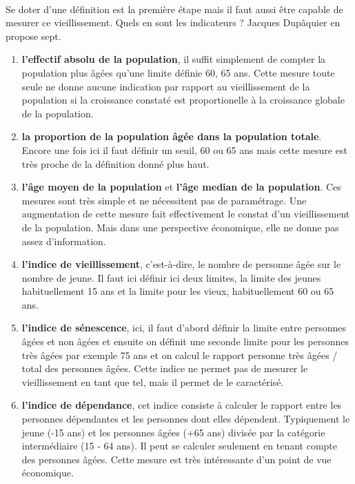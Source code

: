 \paragraph{}Se doter d’une définition est la première étape mais il faut aussi être capable de mesurer ce vieillissement. Quels en sont les indicateurs ? Jacques Dupâquier \citep[pp.10-11]{dupaquier} en propose sept. 
\begin{enumerate}
  \item \textbf{l’effectif absolu de la population}, il suffit simplement de compter la population plus âgées qu’une limite définie 60, 65 ans. Cette mesure toute seule ne donne aucune indication par rapport au vieillissement de la population si la croissance constaté est proportionelle à la croissance globale de la population.
  \item \textbf{la proportion de la population âgée dans la population totale}. Encore une fois ici il faut définir un seuil, 60 ou 65 ans mais cette mesure est très proche de la définition donné plus haut. 
  \item \textbf{l'âge moyen de la population} et \textbf{l’âge median de la population}. Ces mesures sont très simple et ne nécessitent pas de paramétrage. Une augmentation de cette mesure fait effectivement le constat d’un vieillissement de la population. Mais dans une perspective économique, elle ne donne pas assez d’information. 
  \item \textbf{l’indice de vieillissement}, c’est-à-dire, le nombre de personne âgée sur le nombre de jeune. Il faut ici définir ici deux limites, la limite des jeunes habituellement 15 ans et la limite pour les vieux, habituellement 60 ou 65 ans.
  \item \textbf{l’indice de sénescence}, ici, il faut d’abord définir la limite entre personnes âgées et non âgées et ensuite on définit une seconde limite pour les personnes très âgées par exemple 75 ans et on calcul le rapport personne très âgées / total des personnes âgées. Cette indice ne permet pas de mesurer le vieillissement en tant que tel, mais il permet de le caractérisé.
  \item \textbf{l’indice de dépendance}, cet indice consiste à calculer le rapport entre les personnes dépendantes et les personnes dont elles dépendent. Typiquement le jeune (-15 ans) et les personnes âgées (+65 ans) divisée par la catégorie intermédiaire (15 - 64 ans). Il peut se calculer seulement en tenant compte des personnes âgées. Cette mesure est très intéressante d’un point de vue économique. 
\end{enumerate}

